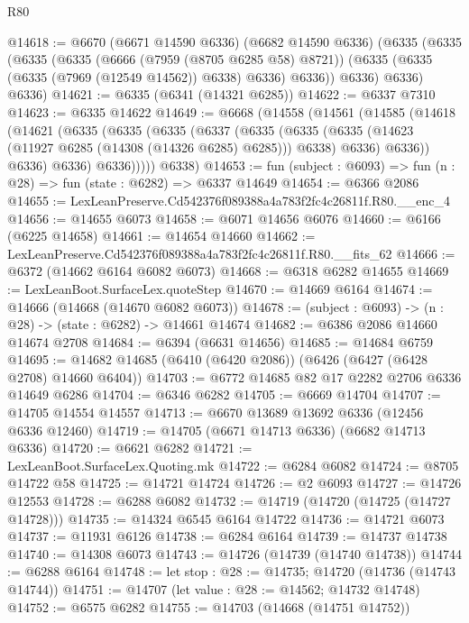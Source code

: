 \begin{lexlean}{R80}
\begin{coremodule}
@14618 := @6670
    (@6671 @14590 @6336)
    (@6682 @14590 @6336)
    (@6335
      (@6335
        (@6335
          (@6335
            (@6666 (@7959 (@8705 @6285 @58) @8721))
            (@6335 (@6335 (@6335 (@7969 (@12549 @14562)) @6338) @6336) @6336))
          @6336)
        @6336)
      @6336)
@14621 := @6335 (@6341 (@14321 @6285))
@14622 := @6337 @7310
@14623 := @6335 @14622
@14649 := @6668
    (@14558
      (@14561
        (@14585
          (@14618
            (@14621
              (@6335
                (@6335
                  (@6335
                    (@6337
                      (@6335
                        (@6335
                          (@6335 (@14623 (@11927 @6285 (@14308 (@14326 @6285) @6285))) @6338)
                          @6336)
                        @6336))
                    @6336)
                  @6336)
                @6336)))))
      @6338)
@14653 := fun (subject : @6093) => fun (n : @28) => fun (state : @6282) => @6337 @14649
@14654 := @6366 @2086
@14655 := LexLeanPreserve.Cd542376f089388a4a783f2fc4c26811f.R80.__enc_4
@14656 := @14655 @6073
@14658 := @6071 @14656 @6076
@14660 := @6166 (@6225 @14658)
@14661 := @14654 @14660
@14662 := LexLeanPreserve.Cd542376f089388a4a783f2fc4c26811f.R80.__fits_62
@14666 := @6372 (@14662 @6164 @6082 @6073)
@14668 := @6318 @6282 @14655
@14669 := LexLeanBoot.SurfaceLex.quoteStep
@14670 := @14669 @6164
@14674 := @14666 (@14668 (@14670 @6082 @6073))
@14678 := (subject : @6093) -> (n : @28) -> (state : @6282) -> @14661 @14674
@14682 := @6386 @2086 @14660 @14674 @2708
@14684 := @6394 (@6631 @14656)
@14685 := @14684 @6759
@14695 := @14682 @14685 (@6410 (@6420 @2086)) (@6426 (@6427 (@6428 @2708) @14660 @6404))
@14703 := @6772 @14685 @82 @17 @2282 @2706 @6336 @14649 @6286
@14704 := @6346 @6282
@14705 := @6669 @14704
@14707 := @14705 @14554 @14557
@14713 := @6670 @13689 @13692 @6336 (@12456 @6336 @12460)
@14719 := @14705 (@6671 @14713 @6336) (@6682 @14713 @6336)
@14720 := @6621 @6282
@14721 := LexLeanBoot.SurfaceLex.Quoting.mk
@14722 := @6284 @6082
@14724 := @8705 @14722 @58
@14725 := @14721 @14724
@14726 := @2 @6093
@14727 := @14726 @12553
@14728 := @6288 @6082
@14732 := @14719 (@14720 (@14725 (@14727 @14728)))
@14735 := @14324 @6545 @6164 @14722
@14736 := @14721 @6073
@14737 := @11931 @6126
@14738 := @6284 @6164
@14739 := @14737 @14738
@14740 := @14308 @6073
@14743 := @14726 (@14739 (@14740 @14738))
@14744 := @6288 @6164
@14748 := let stop : @28 := @14735; @14720 (@14736 (@14743 @14744))
@14751 := @14707 (let value : @28 := @14562; @14732 @14748)
@14752 := @6575 @6282
@14755 := @14703 (@14668 (@14751 @14752))

\end{coremodule}
\end{lexlean}
